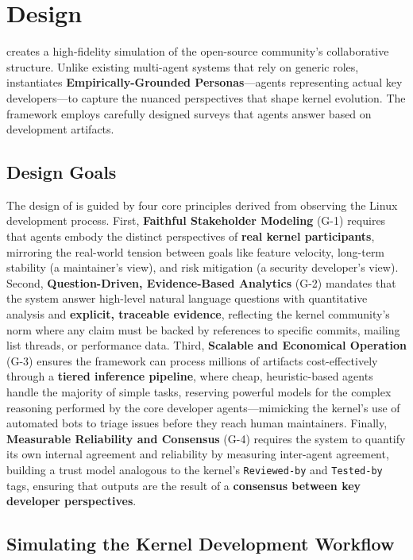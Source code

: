 
\section{Design}
\label{sec:design}

\sys creates a high-fidelity simulation of the open-source community's collaborative structure. Unlike existing multi-agent systems that rely on generic roles, \sys instantiates \textbf{Empirically-Grounded Personas}—agents representing actual key developers—to capture the nuanced perspectives that shape kernel evolution. The framework employs carefully designed surveys that agents answer based on development artifacts.

\subsection{Design Goals}

The design of \sys is guided by four core principles derived from observing the Linux development process. First, \textbf{Faithful Stakeholder Modeling} (G-1) requires that agents embody the distinct perspectives of \textbf{real kernel participants}, mirroring the real-world tension between goals like feature velocity, long-term stability (a maintainer's view), and risk mitigation (a security developer's view). Second, \textbf{Question-Driven, Evidence-Based Analytics} (G-2) mandates that the system answer high-level natural language questions with quantitative analysis and \textbf{explicit, traceable evidence}, reflecting the kernel community's norm where any claim must be backed by references to specific commits, mailing list threads, or performance data. Third, \textbf{Scalable and Economical Operation} (G-3) ensures the framework can process millions of artifacts cost-effectively through a \textbf{tiered inference pipeline}, where cheap, heuristic-based agents handle the majority of simple tasks, reserving powerful models for the complex reasoning performed by the core developer agents—mimicking the kernel's use of automated bots to triage issues before they reach human maintainers. Finally, \textbf{Measurable Reliability and Consensus} (G-4) requires the system to quantify its own internal agreement and reliability by measuring inter-agent agreement, building a trust model analogous to the kernel's \texttt{Reviewed-by} and \texttt{Tested-by} tags, ensuring that outputs are the result of a \textbf{consensus between key developer perspectives}.


\subsection{Simulating the Kernel Development Workflow}

